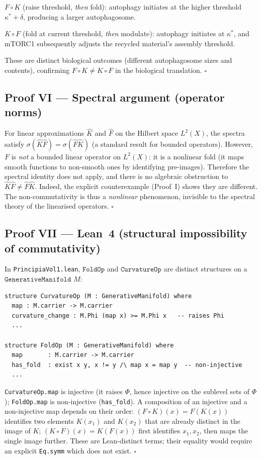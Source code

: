 \documentclass[14pt,a4paper]{extarticle}
\begin{document}
\medskip\noindent
$F \circ K$ (raise threshold, \emph{then} fold): autophagy initiates at the
higher threshold $\kappa^* + \delta$, producing a larger autophagosome.

\noindent
$K \circ F$ (fold at current threshold, \emph{then} modulate): autophagy
initiates at $\kappa^*$, and mTORC1 subsequently adjusts the recycled
material's assembly threshold.

\medskip\noindent
These are distinct biological outcomes (different autophagosome sizes
and contents), confirming $F \circ K \ne K \circ F$ in the
biological translation.  \hfill $\square$

\subsection*{Proof VI\; — Spectral argument (operator norms)}

For linear approximations $\hat K$ and $\hat F$ on the Hilbert space
$L^2(X)$, the spectra satisfy
$\sigma(\hat K \hat F) = \sigma(\hat F \hat K)$
(a standard result for bounded operators).
However, $F$ is \emph{not} a bounded linear operator on $L^2(X)$:
it is a nonlinear fold (it maps smooth functions to non-smooth ones
by identifying pre-images).  Therefore the spectral identity does not
apply, and there is no algebraic obstruction to $\hat K \hat F \ne \hat F \hat K$.
Indeed, the explicit counterexample (Proof~I) shows they are different.
The non-commutativity is thus a \emph{nonlinear} phenomenon, invisible
to the spectral theory of the linearised operators.  \hfill $\square$

\subsection*{Proof VII\; — Lean~4 (structural impossibility of commutativity)}

In \texttt{PrincipiaVol1.lean}, $\texttt{FoldOp}$ and $\texttt{CurvatureOp}$
are distinct structures on a $\texttt{GenerativeManifold}$ $M$:
\begin{verbatim}
structure CurvatureOp (M : GenerativeManifold) where
  map : M.carrier -> M.carrier
  curvature_change : M.Phi (map x) >= M.Phi x   -- raises Phi
  ...

structure FoldOp (M : GenerativeManifold) where
  map       : M.carrier -> M.carrier
  has_fold  : exist x y, x != y /\ map x = map y  -- non-injective
  ...
\end{verbatim}
\texttt{CurvatureOp.map} is injective (it raises $\Phi$, hence injective
on the sublevel sets of $\Phi$);
\texttt{FoldOp.map} is non-injective (\texttt{has\_fold}).
A composition of an injective and a non-injective map depends on
their order: $(F \circ K)(x) = F(K(x))$ identifies two elements
$K(x_1)$ and $K(x_2)$ that are already distinct in the image of $K$;
$(K \circ F)(x) = K(F(x))$ first identifies $x_1, x_2$, then
maps the single image further.
These are Lean-distinct terms; their equality would require an explicit
\texttt{Eq.symm} which does not exist.  \hfill $\square$
\end{document}
